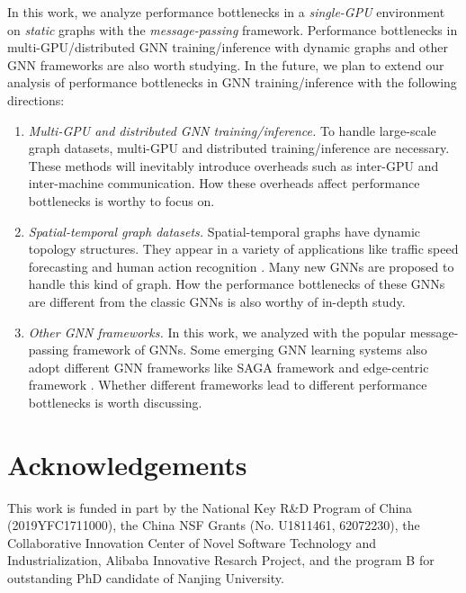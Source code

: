 In this work, we analyze performance bottlenecks in a \emph{single-GPU} environment on \emph{static} graphs with the \emph{message-passing} framework.
%
Performance bottlenecks in multi-GPU/distributed GNN training/inference with dynamic graphs and other GNN frameworks are also worth studying.
%
In the future, we plan to extend our analysis of performance bottlenecks in GNN training/inference with the following directions:
%
\begin{enumerate}
    \item \emph{Multi-GPU and distributed GNN training/inference.}
    To handle large-scale graph datasets, multi-GPU and distributed training/inference are necessary.
    These methods will inevitably introduce overheads such as inter-GPU and inter-machine communication. 
    How these overheads affect performance bottlenecks is worthy to focus on.
    \item \emph{Spatial-temporal graph datasets.}
    Spatial-temporal graphs have dynamic topology structures.
    They appear in a variety of applications like traffic speed forecasting \cite{li2018_DCRNN} and human action recognition \cite{yan2018_STGCN}.
    Many new GNNs are proposed to handle this kind of graph.
    How the performance bottlenecks of these GNNs are different from the classic GNNs is also worthy of in-depth study.
    \item \emph{Other GNN frameworks.}
    In this work, we analyzed with the popular message-passing framework of GNNs.
    Some emerging GNN learning systems also adopt different GNN frameworks like SAGA framework \cite{ma2019_neugraph} and edge-centric framework \cite{he2019_EnGN}.
    Whether different frameworks lead to different performance bottlenecks is worth discussing.
\end{enumerate}

\section*{Acknowledgements}

This work is funded in part by the National Key R\&D Program of China (2019YFC1711000), the China NSF Grants (No. U1811461, 62072230), the Collaborative Innovation Center of Novel Software Technology and Industrialization, Alibaba Innovative Resarch Project, and the program B for outstanding PhD candidate of Nanjing University.

